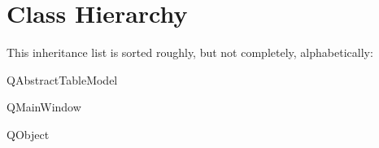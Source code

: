 \section{Class Hierarchy}
This inheritance list is sorted roughly, but not completely, alphabetically\+:\begin{DoxyCompactList}
\item Q\+Abstract\+Table\+Model\begin{DoxyCompactList}
\item {}
\end{DoxyCompactList}
\item Q\+Main\+Window\begin{DoxyCompactList}
\item {}
\end{DoxyCompactList}
\item Q\+Object\begin{DoxyCompactList}
\item {}
\item {}
\item {}
\item {}
\item {}
\end{DoxyCompactList}
\end{DoxyCompactList}
